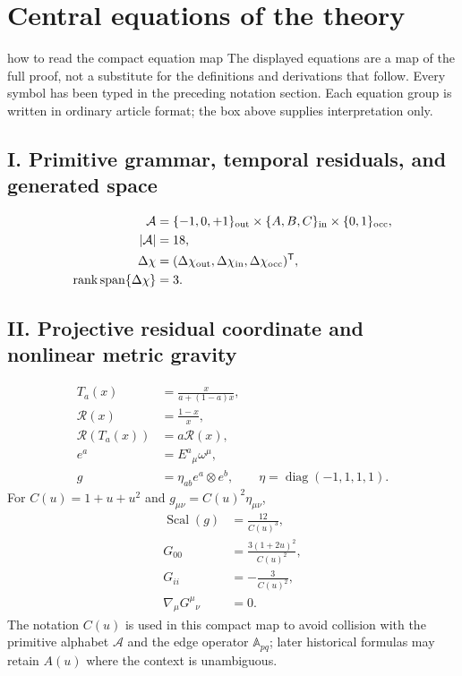 \documentclass[11pt]{article}
\numberwithin{equation}{section}
\theoremstyle{remark}
\newcommand{\rank}{\operatorname{rank}}
\newcommand{\diag}{\operatorname{diag}}
\begin{document}
\clearpage

\section*{Central equations of the theory}

\begin{interpretivebridge}{how to read the compact equation map}
The displayed equations are a map of the full proof, not a substitute for the definitions and derivations that follow. Every symbol has been typed in the preceding notation section. Each equation group is written in ordinary article format; the box above supplies interpretation only.
\end{interpretivebridge}

\subsection*{I. Primitive grammar, temporal residuals, and generated space}
\begin{align}
\mathcal A&=\{-1,0,+1\}_{\rm out}\times\{A,B,C\}_{\rm in}\times\{0,1\}_{\rm occ},\\
|\mathcal A|&=18,\\
\Delta\chi&=(\Delta\chi_{\rm out},\Delta\chi_{\rm in},\Delta\chi_{\rm occ})^{\mathsf T},\\
\rank\operatorname{span}\{\Delta\chi\}&=3.
\end{align}

\subsection*{II. Projective residual coordinate and nonlinear metric gravity}
\begin{align}
T_a(x)&=\frac{x}{a+(1-a)x},\\
\mathcal R(x)&=\frac{1-x}{x},\\
\mathcal R(T_a(x))&=a\mathcal R(x),\\
e^a&=E^a{}_{\mu}\omega^\mu,\\
g&=\eta_{ab}e^a\otimes e^b,\qquad \eta=\diag(-1,1,1,1).
\end{align}
For $C(u)=1+u+u^2$ and $g_{\mu\nu}=C(u)^2\eta_{\mu\nu}$,
\begin{align}
\operatorname{Scal}(g)&=\frac{12}{C(u)^3},\\
G_{00}&=\frac{3(1+2u)^2}{C(u)^2},\\
G_{ii}&=-\frac{3}{C(u)^2},\\
\nabla_{\mu}G^{\mu}{}_{\nu}&=0.
\end{align}
The notation $C(u)$ is used in this compact map to avoid collision with the primitive alphabet $\mathcal A$ and the edge operator $\mathbb A_{pq}$; later historical formulas may retain $A(u)$ where the context is unambiguous.
\end{document}
